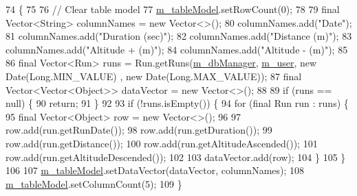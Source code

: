 \begin{DoxyCode}
74                                  \{
75 
76         \textcolor{comment}{// Clear table model}
77         \mbox{\hyperlink{classcom_1_1activitytracker_1_1_main_window_a5e90682f487d5bb840e3afada9e7ff9a}{m\_tableModel}}.setRowCount(0);
78 
79         \textcolor{keyword}{final} Vector<String> columnNames = \textcolor{keyword}{new} Vector<>();
80         columnNames.add(\textcolor{stringliteral}{"Date"});
81         columnNames.add(\textcolor{stringliteral}{"Duration (sec)"});
82         columnNames.add(\textcolor{stringliteral}{"Distance (m)"});
83         columnNames.add(\textcolor{stringliteral}{"Altitude + (m)"});
84         columnNames.add(\textcolor{stringliteral}{"Altitude - (m)"});
85 
86         \textcolor{keyword}{final} Vector<Run> runs = Run.getRuns(\mbox{\hyperlink{classcom_1_1activitytracker_1_1_main_window_ab2af51cb35794567e55564a4d3abbb79}{m\_dbManager}}, \mbox{\hyperlink{classcom_1_1activitytracker_1_1_main_window_a96e28fa47e1740a7ddc16aa48406db85}{m\_user}}, \textcolor{keyword}{new} Date(Long.MIN\_VALUE)
      , \textcolor{keyword}{new} Date(Long.MAX\_VALUE));
87         \textcolor{keyword}{final} Vector<Vector<Object>> dataVector = \textcolor{keyword}{new} Vector<>();
88 
89         \textcolor{keywordflow}{if} (runs == null) \{
90             \textcolor{keywordflow}{return};
91         \}
92 
93         \textcolor{keywordflow}{if} (!runs.isEmpty()) \{
94             \textcolor{keywordflow}{for} (\textcolor{keyword}{final} Run run : runs) \{
95                 \textcolor{keyword}{final} Vector<Object> row = \textcolor{keyword}{new} Vector<>();
96 
97                 row.add(run.getRunDate());
98                 row.add(run.getDuration());
99                 row.add(run.getDistance());
100                 row.add(run.getAltitudeAscended());
101                 row.add(run.getAltitudeDescended());
102 
103                 dataVector.add(row);
104             \}
105         \}
106 
107         \mbox{\hyperlink{classcom_1_1activitytracker_1_1_main_window_a5e90682f487d5bb840e3afada9e7ff9a}{m\_tableModel}}.setDataVector(dataVector, columnNames);
108         \mbox{\hyperlink{classcom_1_1activitytracker_1_1_main_window_a5e90682f487d5bb840e3afada9e7ff9a}{m\_tableModel}}.setColumnCount(5);
109     \}
\end{DoxyCode}
\mbox{\label{classcom_1_1activitytracker_1_1_main_window_a62e9c6f477ccc5b93aff33abb567fde4}} 
